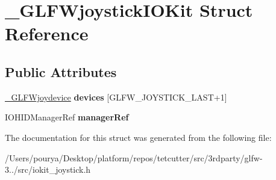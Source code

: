 \hypertarget{struct__GLFWjoystickIOKit}{}\section{\+\_\+\+G\+L\+F\+Wjoystick\+I\+O\+Kit Struct Reference}
\label{struct__GLFWjoystickIOKit}
\subsection*{Public Attributes}
\begin{DoxyCompactItemize}
\item 
\hypertarget{struct__GLFWjoystickIOKit_a29247be14b1a06a315d62ec2d4272aed}{}\hyperlink{struct__GLFWjoydevice}{\+\_\+\+G\+L\+F\+Wjoydevice} {\bfseries devices} \mbox{[}G\+L\+F\+W\+\_\+\+J\+O\+Y\+S\+T\+I\+C\+K\+\_\+\+L\+A\+S\+T+1\mbox{]}\label{struct__GLFWjoystickIOKit_a29247be14b1a06a315d62ec2d4272aed}

\item 
\hypertarget{struct__GLFWjoystickIOKit_a7666c184f6cdf273449ed4c7b5b4df79}{}I\+O\+H\+I\+D\+Manager\+Ref {\bfseries manager\+Ref}\label{struct__GLFWjoystickIOKit_a7666c184f6cdf273449ed4c7b5b4df79}

\end{DoxyCompactItemize}


The documentation for this struct was generated from the following file\+:\begin{DoxyCompactItemize}
\item 
/\+Users/pourya/\+Desktop/platform/repos/tetcutter/src/3rdparty/glfw-\/3../src/iokit\+\_\+joystick.\+h\end{DoxyCompactItemize}

